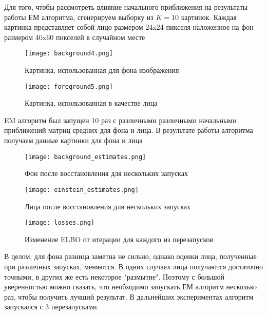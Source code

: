 Для того, чтобы рассмотреть влияние начального приближения на результаты работы ЕМ алгоритма, сгенерируем выборку из $K=10$ картинок. Каждая картинка представляет собой лицо размером 24x24 пикселя наложенное на фон размером 40x60 пикселей в случайном месте
\begin{figure}[H]
	\label{fig:bg_example}
	\texttt{[image: background4.png]}
	\centering
	\caption{Картинка, использованная для фона изображения}
\end{figure}
\begin{figure}[H]
	\label{fig:fg_example}
	\texttt{[image: foreground5.png]}
	\centering
	\caption{Картинка, использованная в качестве лица}
\end{figure}
EM алгоритм был запущен 10 раз с различными различными начальными приближений матриц средних для фона и лица. В результате работы алгоритма получаем данные картинки для фона и лица
\begin{figure}[H]
	\label{fig:background_estimates}
	\texttt{[image: background\_estimates.png]}
	\centering
	\caption{Фон после восстановления для нескольких запусках}
\end{figure}
\begin{figure}[H]
	\label{fig:einstein_estimates}
	\texttt{[image: einstein\_estimates.png]}
	\centering
	\caption{Лица после восстановления для нескольких запусках}
\end{figure}
\begin{figure}[H]
	\label{fig:losses}
	\texttt{[image: losses.png]}
	\centering
	\caption{Изменение ELBO от итерации для каждого из перезапусков}
\end{figure}

В целом, для фона разница заметна не сильно, однако оценки лица, полученные при различных запусках, меняются. В одних случаях лица получаются достаточно точными, в других же есть некоторое "размытие". Поэтому с большой уверенностью можно сказать, что необходимо запускать ЕМ алгоритм несколько раз, чтобы получить лучший результат. В дальнейших экспериментах алгоритм запускался с 3 перезапусками.